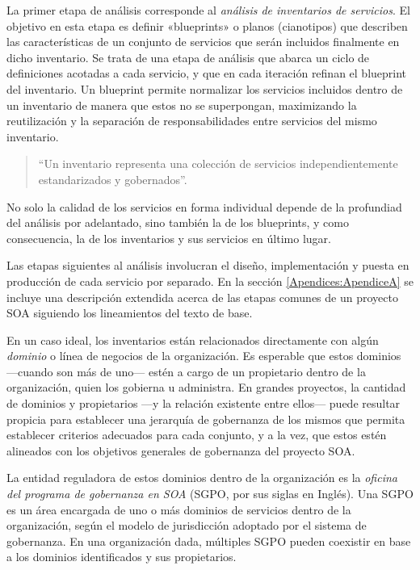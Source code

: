   La primer etapa de análisis corresponde al \emph{análisis de inventarios de servicios}. El objetivo en esta etapa es definir «blueprints» o planos (cianotipos) que describen las características de un conjunto de servicios que serán incluidos finalmente en dicho inventario. Se trata de una etapa de análisis que abarca un ciclo de definiciones acotadas a cada servicio, y que en cada iteración refinan el blueprint del inventario. Un blueprint permite normalizar los servicios incluidos dentro de un inventario de manera que estos no se superpongan, maximizando la reutilización y la separación de responsabilidades entre servicios del mismo inventario. \cite{Erl:2011:SGG:1983453}

  \begin{quote}
    ``Un inventario representa una colección de servicios independientemente estandarizados y gobernados''. \cite{Erl:2011:SGG:1983453}
  \end{quote}

  No solo la calidad de los servicios en forma individual depende de la profundiad del análisis por adelantado, sino también la de los blueprints, y como consecuencia, la de los inventarios y sus servicios en último lugar.

  Las etapas siguientes al análisis involucran el diseño, implementación y puesta en producción de cada servicio por separado. En la sección \ref{Apendices:ApendiceA} se incluye una descripción extendida acerca de las etapas comunes de un proyecto SOA siguiendo los lineamientos del texto de base.

  En un caso ideal, los inventarios están relacionados directamente con algún \emph{dominio} o línea de negocios de la organización. Es esperable que estos dominios —cuando son más de uno— estén a cargo de un propietario dentro de la organización, quien los gobierna u administra. En grandes proyectos, la cantidad de dominios y propietarios —y la relación existente entre ellos— puede resultar propicia para establecer una jerarquía de gobernanza de los mismos que permita establecer criterios adecuados para cada conjunto, y a la vez, que estos estén alineados con los objetivos generales de gobernanza del proyecto SOA.

  La entidad reguladora de estos dominios dentro de la organización es la \emph{oficina del programa de gobernanza en SOA} (SGPO, por sus siglas en Inglés). Una SGPO es un área encargada de uno o más dominios de servicios dentro de la organización, según el modelo de jurisdicción adoptado por el sistema de gobernanza. En una organización dada, múltiples SGPO pueden coexistir en base a los dominios identificados y sus propietarios.

